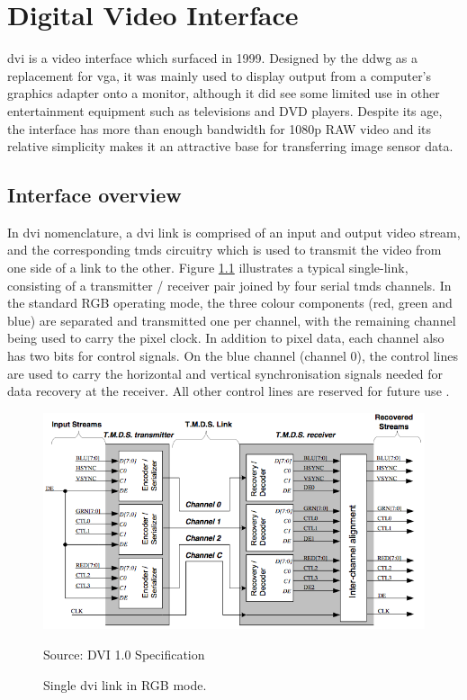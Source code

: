 \chapter{Digital Video Interface}
\gls{dvi} is a video interface which surfaced in 1999. Designed by the \gls{ddwg} as a replacement for \gls{vga}, it was mainly used to display output from a computer's graphics adapter onto a monitor, although it did see some limited use in other entertainment equipment such as televisions and DVD players. Despite its age, the interface has more than enough bandwidth for 1080p RAW video and its relative simplicity makes it an attractive base for transferring image sensor data.

\section{Interface overview}

In \gls{dvi} nomenclature, a \gls{dvi} link is comprised of an input and output video stream, and the corresponding \gls{tmds} circuitry which is used to transmit the video from one side of a link to the other. Figure \ref{fig:dvi_link_overview} illustrates a typical single-link, consisting of a transmitter / receiver pair joined by four serial \gls{tmds} channels. In the standard RGB operating mode, the three colour components (red, green and blue) are separated and transmitted one per channel, with the remaining channel being used to carry the pixel clock. In addition to pixel data, each channel also has two bits for control signals. On the blue channel (channel 0), the control lines are used to carry the horizontal and vertical synchronisation signals needed for data recovery at the receiver. All other control lines are reserved for future use \cite{dvi_spec}.

\begin{figure}
  \centering
  \includegraphics[width=1\textwidth]{./img/dvi_link_overview.png}\par
Source: DVI 1.0 Specification
  \caption{Single \gls{dvi} link in RGB mode.}
  \label{fig:dvi_link_overview}
\end{figure}

